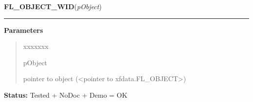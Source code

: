 \hspace{.8\funcindent}\begin{boxedminipage}{\funcwidth}

    \raggedright \textbf{FL\_OBJECT\_WID}(\textit{pObject})

    \vspace{-1.5ex}

    \rule{\textwidth}{0.5\fboxrule}
\setlength{\parskip}{2ex}
\setlength{\parskip}{1ex}
      \textbf{Parameters}
      \vspace{-1ex}

      \begin{quote}
        \begin{Ventry}{xxxxxxx}

          \item[pObject]

          pointer to object ({\textless}pointer to 
          xfdata.FL\_OBJECT{\textgreater})

        \end{Ventry}

      \end{quote}

\textbf{Status:} Tested + NoDoc + Demo = OK



    \end{boxedminipage}

    \label{xformslib:library:fl_XNextEvent}

    \vspace{0.5ex}

